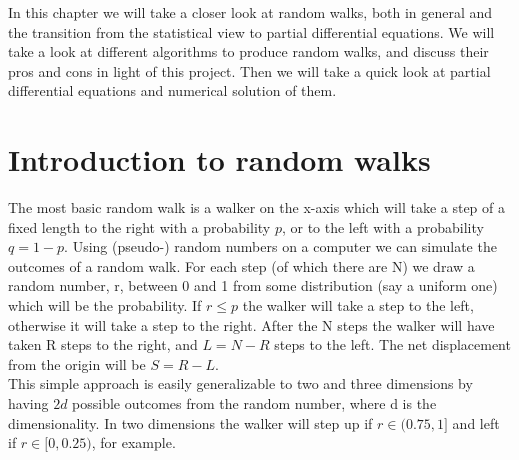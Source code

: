 
In this chapter we will take a closer look at random walks, both in general and the transition from the statistical view to partial differential equations. 
We will take a look at different algorithms to produce random walks, and discuss their pros and cons in light of this project. 
Then we will take a quick look at partial differential equations and numerical solution of them.

\section{Introduction to random walks}\label{introduction_to_random_walks}
The most basic random walk is a walker on the x-axis which will take a step of a fixed length to the right with a probability $p$, or to the left with a probability $q=1-p$. 
Using (pseudo-) random numbers on a computer we can simulate the outcomes of a random walk. 
For each step (of which there are N) we draw a random number, r, between 0 and 1 from some distribution (say a uniform one) which will be the probability. 
If $r\leq p$ the walker will take a step to the left, otherwise it will take a step to the right. 
After the N steps the walker will have taken R steps to the right, and $L = N-R$ steps to the left. 
The net displacement from the origin will be $S = R-L$. \\
This simple approach is easily generalizable to two and three dimensions by having $2d$ possible outcomes from the random number, where d is the dimensionality. 
In two dimensions the walker will step up if $r\in(0.75,1]$ and left if $r\in[0,0.25)$, for example.

